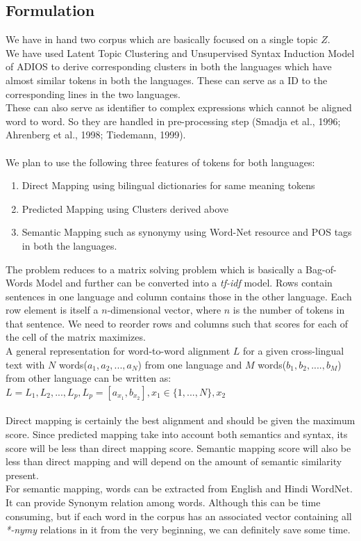 \documentclass{article}
\begin{document}
\subsection{Formulation}

We have in hand two corpus which are basically focused on a single topic $Z$.\\
We have used Latent Topic Clustering and Unsupervised Syntax Induction Model of ADIOS to derive corresponding clusters in both the languages which have almost similar tokens in both the languages. These can serve as a ID to the corresponding lines in the two languages.\\
These can also serve as identifier to complex expressions which cannot be aligned word to word. So they are handled in pre-processing step (Smadja et al., 1996; Ahrenberg et al., 1998; Tiedemann, 1999).
\\\\
We plan to use the following three features of tokens for both languages:
\begin{enumerate}
\item Direct Mapping using bilingual dictionaries for same meaning tokens
\item Predicted Mapping using Clusters derived above
\item Semantic Mapping such as synonymy using Word-Net resource and POS tags in both the languages.
\end{enumerate}

The problem reduces to a matrix solving problem which is basically a Bag-of-Words Model and further can be converted into a \emph{tf-idf} model. Rows contain sentences in one language and column contains those in the other language. Each row element is itself a $n$-dimensional vector, where $n$ is the number of tokens in that sentence. We need to reorder rows and columns such that scores for each of the cell of the matrix maximizes.\\
A general representation for word-to-word alignment $L$ for a given cross-lingual text with $N$ words($a_1,a_2,...,a_N$) from one language and $M$ words($b_1,b_2,....,b_M$) from other language can be written as:\\ $L={L_1,L_2,...,L_p}, L_p=[a_{x_1},b_{x_2}],x_1 \in \{1,...,N\},x_2$\\\\
Direct mapping is certainly the best alignment and should be given the maximum score. Since predicted mapping take into account both semantics and syntax, its score will be less than direct mapping score. Semantic mapping score will also be less than direct mapping and will depend on the amount of semantic similarity present.\\
For semantic mapping, words can be extracted from English and Hindi WordNet. It can provide Synonym relation among words. Although this can be time consuming, but if each word in the corpus has an associated vector containing all \emph{*-nymy} relations in it from the very beginning, we can definitely save some time.
\end{document}
